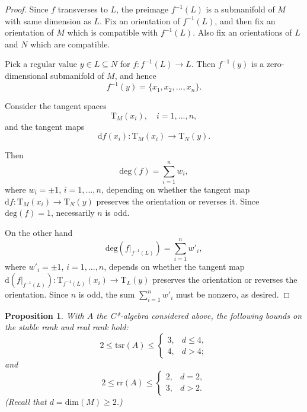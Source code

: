 \documentclass[12pt, oneside, psamsfonts]{amsart}
\newtheorem{prop}[thm]{Proposition}
\theoremstyle{definition}
\theoremstyle{remark}
\numberwithin{equation}{section}
\begin{document}
\begin{proof}
Since $f$ transverses to $L$, the preimage $f^{-1}(L)$ is a submanifold of $M$ with same dimension as $L$. Fix an orientation of $f^{-1}(L)$, and then fix an orientation of $M$ which is compatible with $f^{-1}(L)$. Also fix an orientations of $L$ and $N$ which are compatible.

Pick a regular value $y \in L \subseteq N$ for $f: f^{-1}(L) \to L$. Then $f^{-1}(y)$ is a zero-dimensional submanifold of $M$, and hence $$f^{-1}(y) = \{x_1, x_2, ..., x_n\}.$$ 

Consider the tangent spaces $$\mathrm{T}_M(x_i), \quad i=1, ..., n, $$ and the tangent maps
$$\mathrm{d}f(x_i): \mathrm{T}_M(x_i) \to \mathrm{T}_N(y). $$

Then
$$
\mathrm{deg}(f) = \sum_{i=1}^n w_i,
$$
where $w_i = \pm 1$, $i=1, ..., n$, depending on whether the tangent map $\mathrm df: \mathrm{T}_M(x_i) \to \mathrm{T}_N(y)$ preserves the orientation or reverses it. Since $\mathrm{deg}(f) = 1$, necessarily $n$ is odd.

On the other hand
$$
\mathrm{deg}(f|_{f^{-1}(L)}) = \sum_{i=1}^n w'_i,
$$
where $w'_i = \pm 1$, $i=1, ..., n$, depends on whether the tangent map $\mathrm d(f|_{f^{-1}(L)}): \mathrm{T}_{f^{-1}(L)}(x_i) \to \mathrm{T}_L(y)$ preserves the orientation or reverses the orientation. Since $n$ is odd, the sum $\sum_{i=1}^n w'_i$ must be nonzero, as desired.
%
\end{proof}

\begin{prop}\label{srr}
With $A$ the C*-algebra considered above, the following bounds on the stable rank and real rank hold:  $$2 \leq \mathrm{tsr}(A) \leq \left\{ 
\begin{array}{ll}
3, & d \leq 4, \\
4, & d > 4;
\end{array}
\right.$$
and 
$$  2 \leq \mathrm{rr}(A) \leq 
\left\{ 
\begin{array}{ll}
2, & d = 2, \\
3, & d > 2.
\end{array}
\right.
$$
(Recall that $d = \mathrm{dim}(M) \geq 2$.)
\end{prop}
\end{document}
